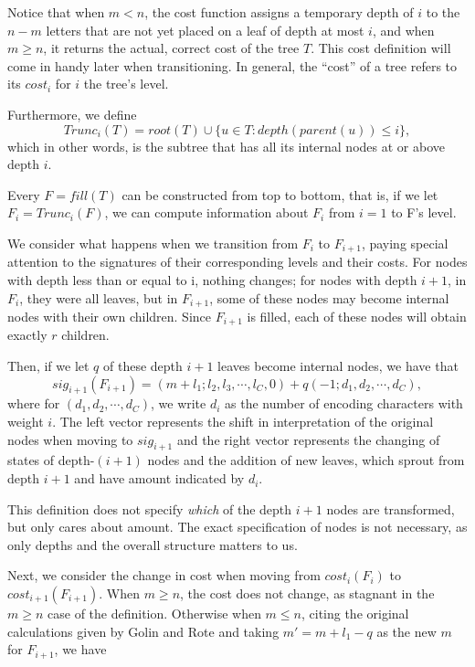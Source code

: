 \documentclass[a4paper,10pt,english]{scrartcl}
\begin{document}
Notice that when $m < n$, the cost function assigns a temporary depth of $i$ to the $n-m$ letters that are not yet placed on a leaf of depth at most $i$, and when $m \ge n$, it returns the actual, correct cost of the tree $T$. This cost definition will come in handy later when transitioning. In general, the ``cost'' of a tree refers to its $cost_i$ for $i$ the tree's level.

Furthermore, we define $$Trunc_i(T) = root(T) \cup \{u \in T: depth(parent(u))\le i\},$$ which in other words, is the subtree that has all its internal nodes at or above depth $i$. 

Every $F = fill(T)$ can be constructed from top to bottom, that is, if we let $F_i = Trunc_i(F)$, we can compute information about $F_i$ from $i = 1$ to F's level. 

We consider what happens when we transition from $F_i$ to $F_{i+1}$, paying special attention to the signatures of their corresponding levels and their costs. For nodes with depth less than or equal to i, nothing changes; for nodes with depth $i+1$, in $F_{i}$, they were all leaves, but in $F_{i+1}$, some of these nodes may become internal nodes with their own children. Since $F_{i+1}$ is filled, each of these nodes will obtain exactly $r$ children.

Then, if we let $q$ of these depth $i+1$ leaves become internal nodes, we have that 
\begin{equation}\label{eq:sigtrans}
sig_{i+1}(F_{i+1}) = (m+l_1; l_2, l_3, \cdots, l_C, 0) + q(-1; d_1, d_2, \cdots , d_C),
\end{equation}
where for $(d_1, d_2, \cdots, d_C)$, we write $d_i$ as the number of encoding characters with weight $i$. The left vector represents the shift in interpretation of the original nodes when moving to $sig_{i+1}$ and the right vector represents the changing of states of depth-$(i+1)$ nodes and the addition of new leaves, which sprout from depth $i+1$ and have amount indicated by $d_i$.

This definition does not specify \textit{which} of the depth $i+1$ nodes are transformed, but only cares about amount. The exact specification of nodes is not necessary, as only depths and  the overall structure matters to us. 

Next, we consider the change in cost when moving from $cost_i(F_i)$ to $cost_{i+1}(F_{i+1})$. When $m \ge n$, the cost does not change, as stagnant in the $m \ge n$ case of the definition. Otherwise when $m \le n$, citing the original calculations given by Golin and Rote \cite{GolinRote1998} and taking $m' = m+l_1-q$ as the new $m$ for $F_{i+1}$, we have
\end{document}
